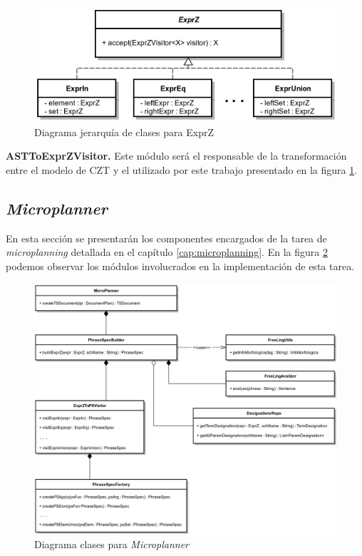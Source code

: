 \begin{figure}[H]
  	\centering
	\includegraphics[scale=0.31]{img/exprz_imp.png}
	\caption{Diagrama jerarquía de clases para ExprZ}
  	\label{fig:imp_exprz}
\end{figure}

\bigskip
\noindent
\textbf{ASTToExprZVisitor.} Este módulo será el responsable de la transformación entre el modelo de CZT y el utilizado por este trabajo presentado en la figura \ref{fig:imp_exprz}.


\subsection{\textit{Microplanner}}

En esta sección se presentarán los componentes encargados de la tarea de \textit{microplanning} detallada en el capítulo \ref{cap:microplanning}. En la figura \ref{fig:imp_microplanner} podemos observar los módulos involucrados en la implementación de esta tarea.

\begin{figure}[H]
  	\centering
	\includegraphics[scale=0.2]{img/microplanner_imp.png}
	\caption{Diagrama clases para \textit{Microplanner}}
  	\label{fig:imp_microplanner}
\end{figure}

